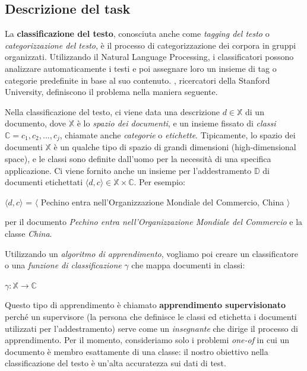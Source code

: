 \subsection{Descrizione del task}
La \textbf{classificazione del testo}, conosciuta anche come \textit{tagging del testo} o \textit{categorizzazione del testo}, è il processo di categorizzazione dei corpora in gruppi organizzati. Utilizzando il Natural Language Processing, i classificatori possono analizzare automaticamente i testi e poi assegnare loro un insieme di tag o categorie predefinite in base al suo contenuto. \citet{textclassificationproblem_stanford}, ricercatori della Stanford University, definiscono il problema nella maniera seguente. 

Nella classificazione del testo, ci viene data una descrizione \(d\in \mathbb{X}\) di un documento, dove \(\mathbb{X}\) è lo \textit{spazio dei documenti}, e un insieme fissato di \textit{classi} \(\mathbb{C}={c_1,c_2,...,c_j}\), chiamate anche \textit{categorie} o \textit{etichette}. Tipicamente, lo spazio dei documenti \(\mathbb{X}\) è un qualche tipo di spazio di grandi dimensioni (high-dimensional space), e le classi sono definite dall'uomo per la necessità di una specifica applicazione. Ci viene fornito anche un insieme per l'addestramento \(\mathbb{D}\) di documenti etichettati \(\langle d,c \rangle \in \mathbb{X} \times \mathbb{C}\).
Per esempio:
\begin{center}
\(\langle d,c \rangle\) = \(\langle\) Pechino entra nell'Organizzazione Mondiale del Commercio, China \(\rangle\)
\end{center}
per il documento \textit{Pechino entra nell'Organizzazione Mondiale del Commercio} e la classe \textit{China}.

Utilizzando un \textit{algoritmo di apprendimento}, vogliamo poi creare un classificatore o una \textit{funzione di classificazione} \(\gamma\) che mappa documenti in classi:
\begin{center}
\(\gamma:\mathbb{X}\rightarrow\mathbb{C}\)
\end{center}

Questo tipo di apprendimento è chiamato \textbf{apprendimento supervisionato} perché un supervisore (la persona che definisce le classi ed etichetta i documenti utilizzati per l'addestramento) serve come un \textit{insegnante} che dirige il processo di apprendimento. Per il momento, consideriamo solo i problemi \textit{one-of} in cui un documento è membro esattamente di una classe: il nostro obiettivo nella classificazione del testo è un'alta accuratezza sui dati di test. 

